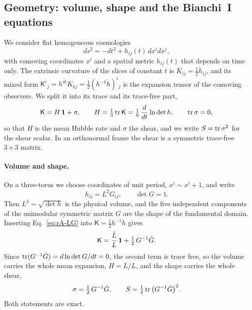 \subsection{Geometry: volume, shape and the Bianchi~I equations}
\label{rA:geometry}

We consider flat homogeneous cosmologies
\begin{equation}
ds^2=-dt^2+h_{ij}(t)\,dx^idx^j ,
\label{eq:rA-metric}
\end{equation}
with comoving coordinates $x^i$ and a spatial metric $h_{ij}(t)$ that depends on time only.
The extrinsic curvature of the slices of constant $t$ is $K_{ij}=\tfrac12\dot h_{ij}$, and its mixed form $\mathsf K^i{}_j=h^{ik}K_{kj}=\tfrac12(h^{-1}\dot h)^i{}_j$ is the expansion tensor of the comoving observers.
We split it into its trace and its trace-free part,
\begin{equation}
\mathsf K=H\,\mathbf{1}+\sigma,\qquad H=\tfrac13\operatorname{tr}\mathsf K=\tfrac16\,\frac{d}{dt}\ln\det h,\qquad \operatorname{tr}\sigma=0,
\label{eq:rA-Ksplit}
\end{equation}
so that $H$ is the mean Hubble rate and $\sigma$ the shear, and we write $S=\operatorname{tr}\sigma^2$ for the shear scalar.
In an orthonormal frame the shear is a symmetric trace-free $3\times3$ matrix.

\paragraph{Volume and shape.}
On a three-torus we choose coordinates of unit period, $x^i\sim x^i+1$, and write
\begin{equation}
h_{ij}=L^2G_{ij},\qquad \det G=1 .
\label{eq:rA-LG}
\end{equation}
Then $L^3=\sqrt{\det h}$ is the physical volume, and the five independent components of the unimodular symmetric matrix $G$ are the shape of the fundamental domain.
Inserting Eq.~\eqref{eq:rA-LG} into $\mathsf K=\tfrac12h^{-1}\dot h$ gives
\begin{equation}
\mathsf K=\frac{\dot L}{L}\,\mathbf{1}+\tfrac12\,G^{-1}\dot G .
\label{eq:rA-Kshape}
\end{equation}
Since $\operatorname{tr}(G^{-1}\dot G)=d\ln\det G/dt=0$, the second term is trace free, so the volume carries the whole mean expansion, $H=\dot L/L$, and the shape carries the whole shear,
\begin{equation}
\sigma=\tfrac12\,G^{-1}\dot G,\qquad S=\tfrac14\operatorname{tr}\big(G^{-1}\dot G\big)^2 .
\label{eq:rA-shear}
\end{equation}
Both statements are exact.

